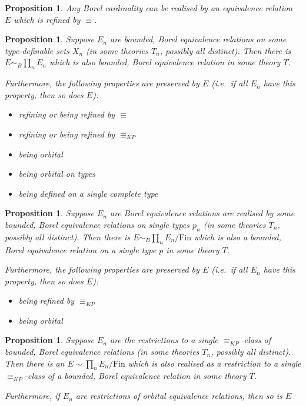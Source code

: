 \documentclass[final,a4paper,12pt]{amsart}
\newtheorem{prop}[thm]{Proposition}
\theoremstyle{remark}
\theoremstyle{definition}
\newcommand{\Fin}{\textrm{Fin}}
\newcommand{\KPeq}{\mathrel{\equiv_{KP}}}
\begin{document}
	\begin{prop}
		Any Borel cardinality can be realised by an equivalence relation $E$ which is refined by $\equiv$.
	\end{prop}
	
	\begin{prop}
		Suppose $E_n$ are bounded,  Borel equivalence relations on some type-definable sets $X_n$ (in some theories $T_n$, possibly all distinct). Then there is $E\sim_B \prod_nE_n$ which is also bounded, Borel equivalence relation in some theory $T$.
		
		Furthermore, the following properties are preserved by $E$ (i.e.\, if all $E_n$ have this property, then so does $E$):
		\begin{itemize}
			\item
			refining or being refined by $\equiv$
			\item
			refining or being refined by $\KPeq$
			\item
			being orbital
			\item
			being orbital on types
			\item
			being defined on a single complete type
		\end{itemize}
	\end{prop}
	
	\begin{prop}
		Suppose $E_n$ are Borel equivalence relations are realised by some bounded, Borel equivalence relations on single types $p_n$ (in some theories $T_n$, possibly all distinct). Then there is $E\sim_B\prod_nE_n/\Fin$ which is also a bounded, Borel equivalence relation on a single type $p$ in some theory $T$.
		
		Furthermore, the following properties are preserved by $E$ (i.e.\, if all $E_n$ have this property, then so does $E$):
		\begin{itemize}
			\item
			being refined by $\KPeq$
			\item
			being orbital
		\end{itemize}
	\end{prop}
	
	\begin{prop}
		Suppose $E_n$ are the restrictions to a single ${\KPeq}$-class of bounded, Borel equivalence relations (in some theories $T_n$, possibly all distinct). Then there is an $E\sim\prod_nE_n/\Fin$ which is also realised as a restriction to a single ${\KPeq}$-class of a bounded, Borel equivalence relation in some theory $T$.
		
		Furthermore, if $E_n$ are restrictions of orbital equivalence relations, then so is $E$
	\end{prop}
	
\end{document}
